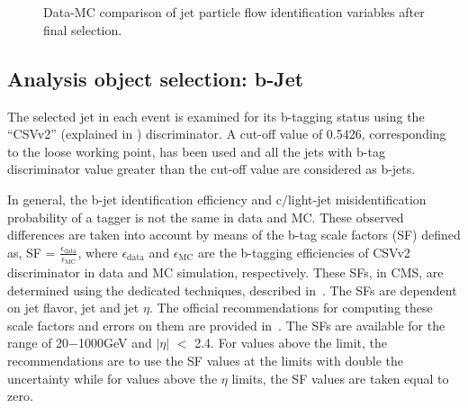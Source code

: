 \begin{figure}[htpb]
\centering
{} \hspace{0.2in}
 \\
 \hspace{0.2in}
   \\
 \hspace{0.2in}
\caption{Data-MC comparison of jet particle flow identification variables after final selection.}
\label{fig:JetId}
\end{figure}

\subsection{Analysis object selection: b-Jet}
The selected jet in each event is examined for its b-tagging status using the ``CSVv2'' (explained in \sectn{\ref{Se:Jet_btagging}})
discriminator. A cut-off value of 0.5426, corresponding to the loose working point, has been used and all the jets with b-tag discriminator
value greater than the cut-off value are considered as b-jets.

In general, the b-jet identification efficiency and c$/$light-jet misidentification probability of a tagger is not the same in data and MC. These observed differences
are taken into account by means of the b-tag scale factors (SF) defined as, SF = $\frac{\epsilon_{\textrm{data}}}{\epsilon_{\textrm{MC}}}$, where
$\epsilon_{\textrm{data}}$ and $\epsilon_{\textrm{MC}}$ are the b-tagging efficiencies of CSVv2 discriminator in data and MC simulation, respectively. These
SFs, in CMS, are determined using the dedicated techniques, described in~\cite{Chatrchyan:2012jua, Sirunyan:2017ezt}.
The SFs are dependent on jet flavor, jet \pt and jet $\eta$.
The official recommendations for computing these scale factors and errors on them are provided
in~\cite{Web:BtagReco}. The SFs are available for the \pt range of 20$-$1000\unit{GeV}
and $|\eta|$ $<$ 2.4. For values above the \pt limit, the recommendations are to use the SF values at the limits with double the uncertainty
while for values above the $\eta$ limits, the SF values are taken equal to zero.

